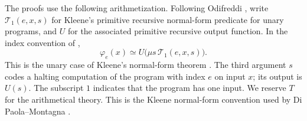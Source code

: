 \documentclass[11pt]{article}
\begin{document}
The proofs use the following arithmetization.
Following Odifreddi
\cite[Theorem~II.1.2, p.~129]{Odifreddi}, write $\mathcal{T}_1(e,x,s)$ for Kleene's
primitive recursive normal-form predicate for unary programs, and $U$
for the associated primitive recursive output function.
In the index convention of \cite[Definition~II.1.4, p.~130]{Odifreddi},
\[
 \varphi_e(x)\simeq U\bigl(\mu s\,\mathcal{T}_1(e,x,s)\bigr).
\]
This is the unary case of Kleene's normal-form theorem
\cite[\S63, Theorem~XIX(a), p.~330]{Kleene}.
The third argument $s$ codes a halting computation of the program with
index $e$ on input $x$; its output is $U(s)$.
The subscript $1$ indicates that the program has one input.
We reserve $T$ for the arithmetical theory.
This is the
Kleene normal-form convention used by Di Paola--Montagna
\cite[p.~645]{DiPaolaMontagna}.
\end{document}
